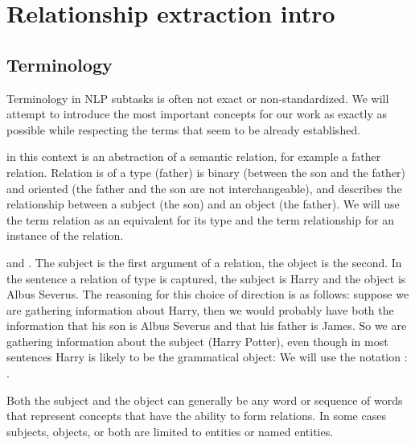 \chapter{Relationship extraction intro} 


\section{Terminology}
Terminology in NLP subtasks is often not exact or non-standardized. We will attempt to introduce the most important concepts for our work as exactly as possible while respecting the terms that seem to be already established. 


 in this context is an abstraction of a semantic relation, for example a father relation. Relation is of a type (father) is binary (between the son and the father) and oriented (the father and the son are not interchangeable), and describes the relationship between a subject (the son) and an object (the father). We will use the term relation as an equivalent for its type and the term relationship for an instance of the relation. 


 and . The subject is the first argument of a relation, the object is the second. In the sentence  a relation of type is captured, the subject is Harry and the object is Albus Severus. The reasoning for this choice of direction is as follows: suppose we are gathering information about Harry, then we would probably have both the information that his son is Albus Severus and that his father is James. So we are gathering information about the subject (Harry Potter), even though in most sentences Harry is likely to be the grammatical object:  We will use the notation : . 

Both the subject and the object can generally be any word or sequence of words that represent concepts that have the ability to form relations. In some cases subjects, objects, or both are limited to entities or named entities.

